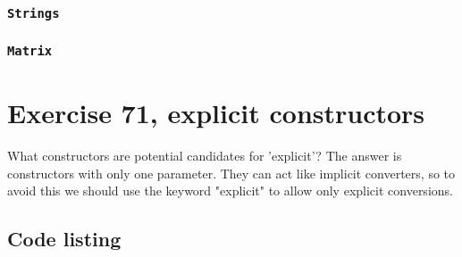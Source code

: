 \documentclass[11pt]{article}
\begin{document}
\subsubsection*{\texttt{Strings}}




\subsubsection*{\texttt{Matrix}}



\section*{Exercise 71, explicit constructors}
What constructors are potential candidates for 'explicit'?
The answer is constructors with only one parameter.
They can act like implicit converters, so to avoid this we should use the keyword "explicit" to allow only explicit conversions.

\subsection*{Code listing}

\end{document}
